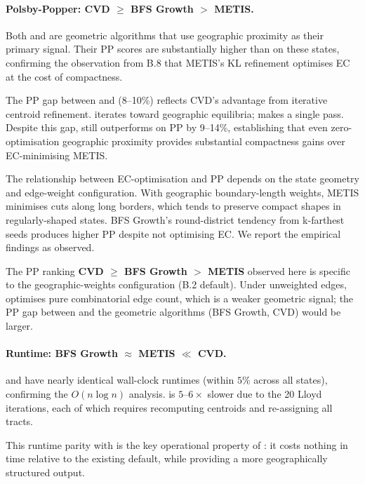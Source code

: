 \paragraph{Polsby-Popper: CVD $\geq$ BFS Growth $>$ METIS.}
Both \bfsg{} and \cvd{} are geometric algorithms that use geographic
proximity as their primary signal.
Their PP scores are substantially higher than \metis{} on these states,
confirming the observation from B.8 that METIS's KL refinement optimises
EC at the cost of compactness.

The PP gap between \bfsg{} and \cvd{} (8--10\%) reflects CVD's advantage
from iterative centroid refinement.
\cvd{} iterates toward geographic equilibria; \bfsg{} makes a single pass.
Despite this gap, \bfsg{} still outperforms \metis{} on PP by 9--14\%,
establishing that even zero-optimisation geographic proximity provides
substantial compactness gains over EC-minimising METIS.

The relationship between EC-optimisation and PP depends on the state geometry
and edge-weight configuration.
With geographic boundary-length weights, METIS minimises cuts along long
borders, which tends to preserve compact shapes in regularly-shaped states.
BFS Growth's round-district tendency from k-farthest seeds produces higher PP
despite not optimising EC.
We report the empirical findings as observed.

\begin{remark}
The PP ranking \textbf{CVD $\geq$ BFS Growth $>$ METIS} observed here
is specific to the geographic-weights configuration (B.2 default).
Under unweighted edges, \metis{} optimises pure combinatorial edge count,
which is a weaker geometric signal; the PP gap between \metis{} and
the geometric algorithms (BFS Growth, CVD) would be larger.
\end{remark}

\paragraph{Runtime: BFS Growth $\approx$ METIS $\ll$ CVD.}
\bfsg{} and \metis{} have nearly identical wall-clock runtimes (within
$5\%$ across all states), confirming the $O(n \log n)$ analysis.
\cvd{} is $5\text{--}6\times$ slower due to the 20 Lloyd iterations, each
of which requires recomputing centroids and re-assigning all tracts.

This runtime parity with \metis{} is the key operational property of
\bfsg{}: it costs nothing in time relative to the existing default,
while providing a more geographically structured output.


